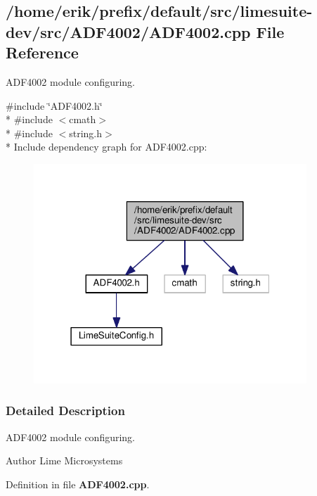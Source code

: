 \subsection{/home/erik/prefix/default/src/limesuite-\/dev/src/\+A\+D\+F4002/\+A\+D\+F4002.cpp File Reference}
\label{ADF4002_8cpp}


A\+D\+F4002 module configuring.  


{\ttfamily \#include \char`\"{}A\+D\+F4002.\+h\char`\"{}}\\*
{\ttfamily \#include $<$cmath$>$}\\*
{\ttfamily \#include $<$string.\+h$>$}\\*
Include dependency graph for A\+D\+F4002.\+cpp\+:
\nopagebreak
\begin{figure}[H]
\begin{center}
\leavevmode
\includegraphics[width=291pt]{d8/dfc/ADF4002_8cpp__incl}
\end{center}
\end{figure}


\subsubsection{Detailed Description}
A\+D\+F4002 module configuring. 

\begin{DoxyAuthor}{Author}
Lime Microsystems 
\end{DoxyAuthor}


Definition in file {\bf A\+D\+F4002.\+cpp}.

